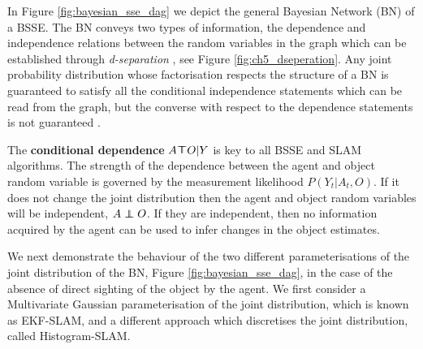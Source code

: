 In Figure \ref{fig:bayesian_sse_dag} we depict the general Bayesian Network (BN) of a BSSE. The BN conveys two types of
information, the dependence and independence relations between the random variables in the graph which can be established
through \textit{d-separation} \cite{BayesBall}, see Figure \ref{fig:ch5_dseperation}. Any joint probability distribution 
whose factorisation  respects the structure of a BN is guaranteed to satisfy all the conditional independence 
statements which can be read from the graph, but the converse with respect to the dependence statements is 
not guaranteed \cite[p.43]{barberBRML2012}. 

The \textbf{conditional dependence} $A \dependent O | Y$ is key to all BSSE and SLAM algorithms. The strength of the dependence 
between the agent and object random variable is governed by the measurement likelihood $P(Y_t|A_t,O)$. If it does not change the 
joint distribution then the agent and object random variables will be independent, $A \independent O$. If they are independent, 
then no information acquired by the agent can be used to infer changes in the object estimates.


We next demonstrate the behaviour of the two different parameterisations of the joint distribution of the BN, 
Figure \ref{fig:bayesian_sse_dag}, in the case of the absence of direct sighting of the object by the agent. We first consider a
Multivariate Gaussian parameterisation of the joint distribution, which is known as EKF-SLAM, and 
a different approach which discretises the joint distribution, called Histogram-SLAM.

